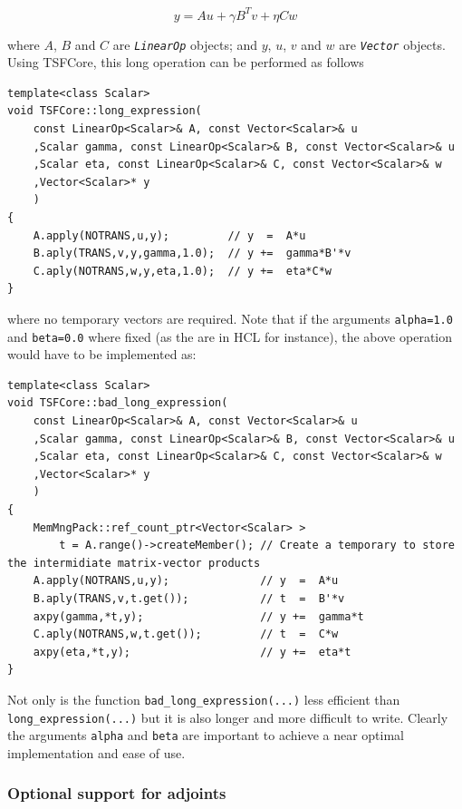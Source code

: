 \documentclass[10pt,fleqn]{article}
\begin{document}
\[
y = A u + \gamma B^T v + \eta C w
\]

where $A$, $B$ and $C$ are \texttt{\textit{LinearOp}} objects; and $y$,
$u$, $v$ and $w$ are \texttt{\textit{Vector}} objects.  Using TSFCore, this
long operation can be performed as follows

{\scriptsize\begin{verbatim}
template<class Scalar>
void TSFCore::long_expression(
    const LinearOp<Scalar>& A, const Vector<Scalar>& u
    ,Scalar gamma, const LinearOp<Scalar>& B, const Vector<Scalar>& u
    ,Scalar eta, const LinearOp<Scalar>& C, const Vector<Scalar>& w
    ,Vector<Scalar>* y
    )
{
    A.apply(NOTRANS,u,y);         // y  =  A*u
    B.aply(TRANS,v,y,gamma,1.0);  // y +=  gamma*B'*v
    C.aply(NOTRANS,w,y,eta,1.0);  // y +=  eta*C*w
}
\end{verbatim}}

where no temporary vectors are required.  Note that if the arguments
\texttt{alpha=1.0} and \texttt{beta=0.0} where fixed (as the are
in HCL for instance), the above operation would have to be implemented
as:

{\scriptsize\begin{verbatim}
template<class Scalar>
void TSFCore::bad_long_expression(
    const LinearOp<Scalar>& A, const Vector<Scalar>& u
    ,Scalar gamma, const LinearOp<Scalar>& B, const Vector<Scalar>& u
    ,Scalar eta, const LinearOp<Scalar>& C, const Vector<Scalar>& w
    ,Vector<Scalar>* y
    )
{
    MemMngPack::ref_count_ptr<Vector<Scalar> >
        t = A.range()->createMember(); // Create a temporary to store the intermidiate matrix-vector products
    A.apply(NOTRANS,u,y);              // y  =  A*u
    B.aply(TRANS,v,t.get());           // t  =  B'*v
    axpy(gamma,*t,y);                  // y +=  gamma*t
    C.aply(NOTRANS,w,t.get());         // t  =  C*w
    axpy(eta,*t,y);                    // y +=  eta*t
}
\end{verbatim}}

Not only is the function \texttt{bad\_long\_expression(...)} less
efficient than \texttt{long\_expression(...)} but it is also longer
and more difficult to write.  Clearly the arguments \texttt{alpha} and
\texttt{beta} are important to achieve a near optimal implementation
and ease of use.

%
\subsubsection{Optional support for adjoints}
\label{tsfcore:sec:linear_op_adjoints}
%
\end{document}
